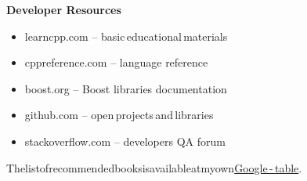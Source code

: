\documentclass{beamer}
\begin{document}
\begin{frame}{\bf Developer Resources}

    \begin{itemize}

        \item learncpp.com -- basic\,educational\,materials

        \item cppreference.com -- language reference

        \item boost.org -- Boost libraries documentation

        \item github.com -- open\,projects\,and\,libraries

        \item stackoverflow.com -- developers QA forum

    \end{itemize}

    \begin{block}
    \justifying The\:list\:of\:recommended\:books\:is\:available\:at\:my\:own\:\href{https://docs.google.com/spreadsheets/d/1MAx4-DoZUrZEB210XJ524e-0OogZRvH7QBorja_tGiw/edit?usp=sharing}{Google\,-\,table}.
    \end{block}
    
\end{frame}
\end{document}

